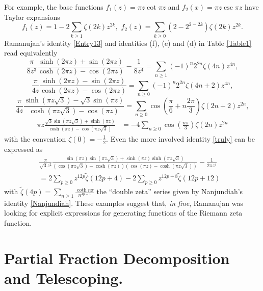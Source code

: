 \documentclass[11pt,oneside,reqno]{article}
\theoremstyle{definition}
\begin{document}
For example, the base functions $f_1(z)=\pi z \cot \pi z$ and $f_2(x)=\pi z \csc \pi z$
have Taylor expansions
\[
f_1(z) = 1-2\sum_{k\ge1}\zeta\left(2k\right)z^{2k},\,\,
f_2(z) = \sum_{k\ge 0}\left(2-2^{2-2k}\right) \zeta (2k) z^{2k}.
\]
Ramanujan's identity \eqref{Entry13} and identities (f), (e) and (d) in Table \ref{Table1}  read equivalently
\[
\frac{\pi}{8z^{3}}\frac{\sinh\left(2\pi z\right)+\sin\left(2\pi z\right)}{\cosh\left(2\pi z\right)-\cos\left(2\pi z\right)}-\frac{1}{8z^{4}}=
\sum_{n \ge 1}(-1)^n 2^{2n} \zeta(4n) z^{4n},
\]
\[
\frac{\pi}{4z}\frac{\sinh\left(2\pi z\right)-\sin\left(2\pi z\right)}{\cosh\left(2\pi z\right)-\cos\left(2\pi z\right)} = \sum_{n \ge 0}(-1)^n 2^{2n}\zeta(4n+2) z^{4n},
\]
\[
\frac{\pi}{4z}\frac{\sinh\left(\pi z\sqrt{3}\right)-\sqrt{3}\sin\left(\pi z\right)}{\cosh\left(\pi z\sqrt{3}\right)-\cos\left(\pi z\right)}
=\sum_{n \ge 0}\cos(\frac{\pi}{6}+n\frac{2\pi}{3})\zeta(2n+2)z^{2n},
\] 
\begin{align}
\nonumber
\pi z\frac{\sqrt{3}\sin\left(\pi z\sqrt{3}\right)+\sinh\left(\pi z\right)}{\cosh\left(\pi z\right)-\cos\left(\pi z\sqrt{3}\right)}&
=-4\sum_{n\ge0}\cos\left(\frac{n\pi}{3}\right)\zeta\left(2n\right)z^{2n}
\end{align} 
with the convention $\zeta(0)=-\frac{1}{2}.$
Even the more  involved identity \eqref{truly} can be expressed as
\begin{align*}
\frac{\pi}{\sqrt{3}z^{2}}\frac{\sin\left(\pi z\right)\sin\left(\pi z\sqrt{3}\right)+\sinh\left(\pi z\right)\sinh\left(\pi z\sqrt{3}\right)}{\left(\cos\left(\pi z\sqrt{3}\right)-\cosh\left(\pi z\right)\right)\left(\cos\left(\pi z\right)-\cosh\left(\pi z\sqrt{3}\right)\right)}-\frac{1}{2\pi z^{4}}&\\
=2\sum_{p\ge0}z^{12p}\tilde{\zeta}(12p+4)-2\sum_{p\ge0}z^{12p+8}\tilde{\zeta}(12p+12)
\end{align*}
with $\tilde{\zeta}(4p)=\sum_{n\ge 1}\frac{\coth{n\pi}}{n^{4p-1}}$ the ``double  zeta'' series  given by Nanjundiah's identity
 \eqref{Nanjundiah}. These examples suggest that, \textit{in fine}, Ramanujan was looking for explicit expressions for generating  functions of the Riemann zeta function.

 
\section{Partial Fraction Decomposition and Telescoping.}
\end{document}
